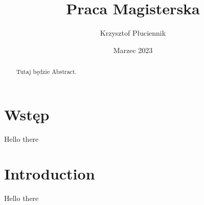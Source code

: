 \documentclass[12pt, letterpaper]{article}
\title{Praca Magisterska}
\author{Krzysztof Płuciennik}
\date{Marzec 2023}
\begin{document}
\maketitle

\begin{abstract}
    Tutaj będzie Abstract.
\end{abstract}

\section{Wstęp}

Hello there

\section{Introduction}


Hello there
\end{document}
